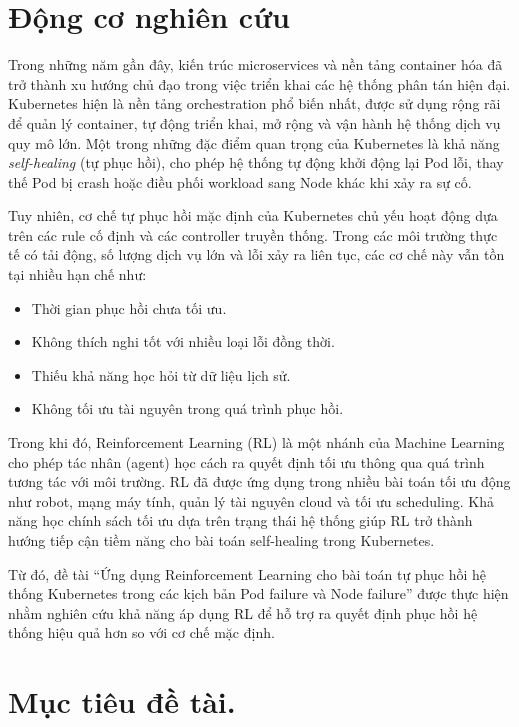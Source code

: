 \section{Động cơ nghiên cứu}

Trong những năm gần đây, kiến trúc microservices và nền tảng container hóa đã trở thành xu hướng chủ đạo trong việc triển khai các hệ thống phân tán hiện đại. Kubernetes hiện là nền tảng orchestration phổ biến nhất, được sử dụng rộng rãi để quản lý container, tự động triển khai, mở rộng và vận hành hệ thống dịch vụ quy mô lớn. Một trong những đặc điểm quan trọng của Kubernetes là khả năng \textit{self-healing} (tự phục hồi), cho phép hệ thống tự động khởi động lại Pod lỗi, thay thế Pod bị crash hoặc điều phối workload sang Node khác khi xảy ra sự cố.

Tuy nhiên, cơ chế tự phục hồi mặc định của Kubernetes chủ yếu hoạt động dựa trên các rule cố định và các controller truyền thống. Trong các môi trường thực tế có tải động, số lượng dịch vụ lớn và lỗi xảy ra liên tục, các cơ chế này vẫn tồn tại nhiều hạn chế như:
\begin{itemize}
    \item Thời gian phục hồi chưa tối ưu.
    \item Không thích nghi tốt với nhiều loại lỗi đồng thời.
    \item Thiếu khả năng học hỏi từ dữ liệu lịch sử.
    \item Không tối ưu tài nguyên trong quá trình phục hồi.
\end{itemize}

Trong khi đó, Reinforcement Learning (RL) là một nhánh của Machine Learning cho phép tác nhân (agent) học cách ra quyết định tối ưu thông qua quá trình tương tác với môi trường. RL đã được ứng dụng trong nhiều bài toán tối ưu động như robot, mạng máy tính, quản lý tài nguyên cloud và tối ưu scheduling. Khả năng học chính sách tối ưu dựa trên trạng thái hệ thống giúp RL trở thành hướng tiếp cận tiềm năng cho bài toán self-healing trong Kubernetes.

Từ đó, đề tài “Ứng dụng Reinforcement Learning cho bài toán tự phục hồi hệ thống Kubernetes trong các kịch bản Pod failure và Node failure” được thực hiện nhằm nghiên cứu khả năng áp dụng RL để hỗ trợ ra quyết định phục hồi hệ thống hiệu quả hơn so với cơ chế mặc định.

\section{Mục tiêu đề tài.}

